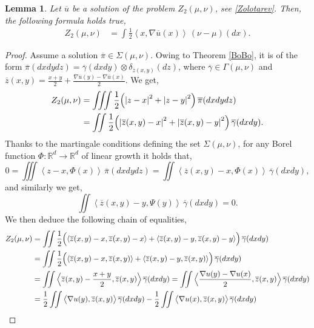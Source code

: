 \documentclass[11pt,reqno]{amsart}
\newtheorem{lemma}[theorem]{Lemma}
\theoremstyle{definition}
\numberwithin{equation}{section}
\newcommand{\R}{\mathbb{R}}
\newcommand{\Rd}{{\R^d}}
\newcommand{\ov}{\overline}
\newcommand{\pairing}[1]{{\left \langle #1 \right \rangle}}
\newcommand{\abs}[1]{{\left \lvert #1 \right \rvert}}
\begin{document}
\begin{lemma}
    \label{magic_formula}
    Let $\ov{u}$ be a solution of the problem $Z_2(\mu,\nu)$, see \eqref{Zolotarev}. Then, the following formula holds true,
    \begin{align}\label{magic=}
        Z_2(\mu,\nu) &= \int \frac{1}{2} \pairing{x,\nabla \ov{u}(x)} \, (\nu-\mu)(dx).
    \end{align}
\end{lemma}
\begin{proof}
    Assume a solution $\ov{\pi} \in \Sigma(\mu,\nu)$. Owing to Theorem  \ref{BoBo}, it is of the form $\ov{\pi}(dxdydz) = \ov\gamma(dxdy) \otimes \delta_{\ov{z}(x,y)}(dz)$, where $\ov\gamma \in \Gamma(\mu,\nu)$ and $\ov{z}(x,y) = \frac{x+y}{2} + \frac{\nabla \ov u(y)-\nabla \ov u(x)}{2}$. We get,
    \begin{align}
        Z_2(\mu,\nu) &= \iiint \frac{1}{2} \Bigl( \abs{z-x}^2 + \abs{z-y}^2 \Bigr) \, \ov\pi(dxdydz)  \\
        & = \iint \frac{1}{2} \Bigl( \abs{\ov{z}(x,y)-x}^2 + \abs{\ov{z}(x,y)-y}^2 \Bigr) \, \ov\gamma(dxdy).
    \end{align}
    Thanks to the martingale conditions defining the set $\Sigma(\mu,\nu)$, for any Borel function $\Phi:\Rd \to \Rd$ of linear growth it holds that,
    \begin{equation} \label{mart1}
        0 = \iiint  \pairing{z-x,\Phi(x)} \, \ov\pi(dxdydz) = \iint  \pairing{\ov{z}(x,y)-x,\Phi(x)} \, \ov\gamma(dxdy),
    \end{equation}
    and similarly we get,
    \begin{equation} \label{mart2}
       \iint  \pairing{\ov{z}(x,y)-y,\Psi(y)} \, \ov\gamma(dxdy)=0.
    \end{equation}
  We then deduce the following chain of equalities,
    \begin{align*}
    	Z_2(\mu,\nu) & =  \iint \frac{1}{2} \Bigl( \pairing{\ov{z}(x,y)-x,\ov{z}(x,y)-x} + \pairing{\ov{z}(x,y)-y,\ov{z}(x,y)-y} \Bigr) \, \ov\gamma(dxdy) \\
    	& =  \iint \frac{1}{2} \Bigl( \pairing{\ov{z}(x,y)-x,\ov{z}(x,y)} + \pairing{\ov{z}(x,y)-y,\ov{z}(x,y)} \Bigr) \, \ov\gamma(dxdy) \\
    	&= \iint \Big\langle \ov{z}(x,y) - \frac{x+y}{2}, \ov{z}(x,y) \Big\rangle  \, \ov\gamma(dxdy) = \iint \Big\langle \frac{ \nabla u(y) - \nabla u(x)}{2}, \ov{z}(x,y) \Big\rangle  \, \ov\gamma(dxdy) \\
    	& = \frac{1}{2 } \iint \big\langle \nabla u(y), \ov{z}(x,y) \big\rangle  \, \ov\gamma(dxdy)  - \frac{1}{2 } \iint \big\langle \nabla u(x), \ov{z}(x,y) \big\rangle  \, \ov\gamma(dxdy) \\

\end{align*}
\end{proof}
\end{document}

